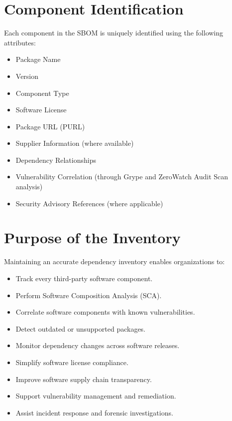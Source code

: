 
\vspace{0.4cm}


\section{Component Identification}

Each component in the SBOM is uniquely identified using the following attributes:
\begin{itemize}
\item Package Name
\item Version
\item Component Type
\item Software License
\item Package URL (PURL)
\item Supplier Information (where available)
\item Dependency Relationships
\item Vulnerability Correlation (through Grype and ZeroWatch Audit Scan analysis)
\item Security Advisory References (where applicable)
\end{itemize}

\vspace{0.4cm}


\section{Purpose of the Inventory}

Maintaining an accurate dependency inventory enables organizations to:
\begin{itemize}
\item Track every third-party software component.
\item Perform Software Composition Analysis (SCA).
\item Correlate software components with known vulnerabilities.
\item Detect outdated or unsupported packages.
\item Monitor dependency changes across software releases.
\item Simplify software license compliance.
\item Improve software supply chain transparency.
\item Support vulnerability management and remediation.
\item Assist incident response and forensic investigations.
\end{itemize}

